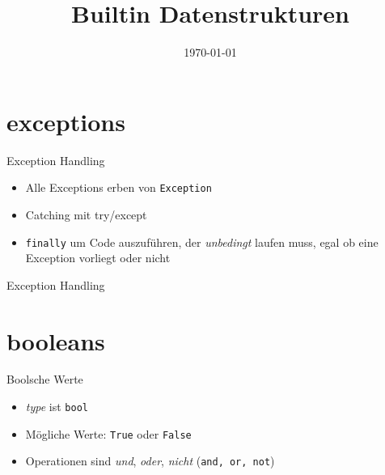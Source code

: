\usepackage[utf8]{inputenc}

\newcommand{\topic}{
	Builtin Datenstrukturen
}

\title{\topic}
\supertitle{\course}
\date{\today}



\maketitle

\begin{frame}
	\tableofcontents
\end{frame}

\section{exceptions}
\begin{frame}{Exception Handling}
\begin{itemize}
	\item Alle Exceptions erben von \texttt{Exception}
	\item Catching mit try/except
	\item \texttt{finally} um Code auszuf\"uhren, der \textit{unbedingt} laufen muss, egal ob eine Exception vorliegt oder nicht
\end{itemize}
\end{frame}
\begin{frame}{Exception Handling}

\end{frame}

\section{booleans}
\begin{frame}{Boolsche Werte}
\begin{itemize}
	\item \textit{type} ist \texttt{bool}
	\item M\"ogliche Werte: \texttt{True} oder \texttt{False}
	\item Operationen sind \textit{und}, \textit{oder}, \textit{nicht} (\texttt{and, or, not})
\end{itemize}
\end{frame}

